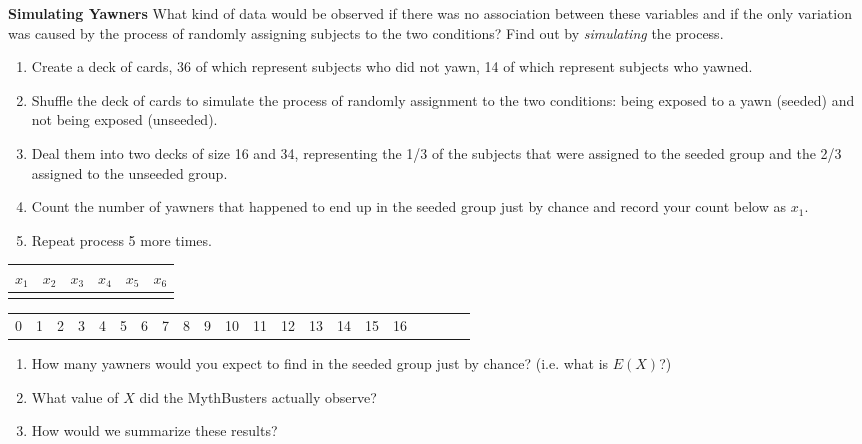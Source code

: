 \documentclass[10pt]{article}\usepackage[]{graphicx}\usepackage[]{color}
\newcommand{\ans}{\vspace{0.5in}}
\begin{document}
\textbf{Simulating Yawners} What kind of data would be observed if there was no association between these variables and if the only variation was caused by the process of randomly assigning subjects to the two conditions? Find out by \emph{simulating} the process.
\begin{enumerate}
  \item Create a deck of cards, 36 of which represent subjects who did not yawn, 14 of which represent subjects who yawned.
  \item Shuffle the deck of cards to simulate the process of randomly assignment to the two conditions: being exposed to a yawn (seeded) and not being exposed (unseeded).
  \item Deal them into two decks of size 16 and 34, representing the 1/3 of the subjects that were assigned to the seeded group and the 2/3 assigned to the unseeded group.
  \item Count the number of yawners that happened to end up in the seeded group just by chance and record your count below as $x_1$.
  \item Repeat process 5 more times.
\end{enumerate}

\begin{center}
\begin{tabular}{|c|c|c|c|c|c|}
  \hline
  $x_1$ & $x_2$ & $x_3$ & $x_4$ & $x_5$ & $x_6$ \\
  \hline
  \hspace{0.75in} & \hspace{0.75in} & \hspace{0.75in} & \hspace{0.75in} & \hspace{0.75in} & \hspace{0.75in} \\[5ex]
  \hline
\end{tabular}
\end{center}

\vspace{2.5in}

\begin{center}
\begin{tabular}{|c|c|c|c|c|c|c|c|c|c|c|c|c|c|c|c|c|c|c|c|c|}
  \hline
  0 & 1 & 2 & 3 & 4 & 5 & 6 & 7 & 8 & 9 & 10 & 11 & 12 & 13 & 14 & 15 & 16 \\
\end{tabular}
\end{center}

\vspace{5mm}

\begin{enumerate}
  \item How many yawners would you expect to find in the seeded group just by chance? (i.e. what is $E(X)$?)
  \ans
  \item What value of $X$ did the MythBusters actually observe?
  \ans
  \item How would we summarize these results?
  \ans
\end{enumerate}
\end{document}
